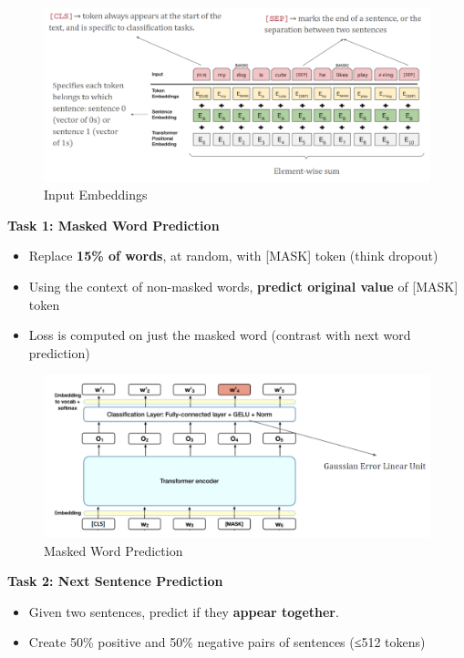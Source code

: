 \begin{figure}[h!t]
    \centering
    \includegraphics[width=01\linewidth]{inputemb.png}
    \caption{Input Embeddings}
    \label{fig:enter-label}
\end{figure}

\noindent
\textbf{Task 1: Masked Word Prediction}
\begin{itemize}
    \item Replace \textbf{15\% of words}, at random, with [MASK] token (think dropout)
    \item Using the context of non-masked words, \textbf{predict original value} of [MASK] token
    \item Loss is computed on just the masked word (contrast with next word prediction)
\end{itemize}

\begin{figure}[h!t]
    \centering
    \includegraphics[width=1\linewidth]{maskedwordpred.png}
    \caption{Masked Word Prediction}
    \label{fig:enter-label}
\end{figure}

\noindent
\textbf{Task 2: Next Sentence Prediction}

\begin{itemize}
    \item Given two sentences, predict if they \textbf{appear together}.
    \item Create 50\% positive and 50\% negative pairs of sentences (≤512 tokens)
\end{itemize}

